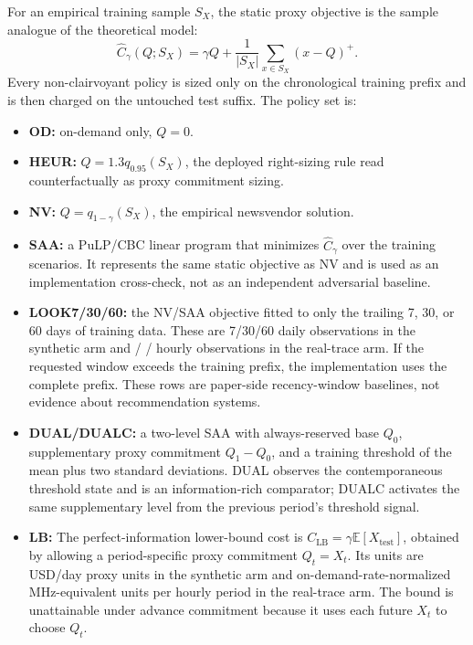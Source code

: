 \documentclass[11pt]{article}
\begin{document}
For an empirical training sample \(S_X\), the static proxy objective is the
sample analogue of the theoretical model:
\begin{equation}
\widehat C_\gamma(Q;S_X)
  = \gamma Q + \frac{1}{|S_X|}\sum_{x\in S_X}(x-Q)^+ .
\end{equation}
Every non-clairvoyant policy is sized only on the chronological training
prefix and is then charged on the untouched test suffix. The policy set is:
\begin{itemize}
\item \textbf{OD:} on-demand only, \(Q=0\).
\item \textbf{HEUR:} \(Q=1.3q_{0.95}(S_X)\), the deployed right-sizing rule
read counterfactually as proxy commitment sizing.
\item \textbf{NV:} \(Q=q_{1-\gamma}(S_X)\), the empirical newsvendor solution.
\item \textbf{SAA:} a PuLP/CBC linear program that minimizes
\(\widehat C_\gamma\) over the training scenarios. It represents the same
static objective as NV and is used as an implementation cross-check, not as
an independent adversarial baseline.
\item \textbf{LOOK7/30/60:} the NV/SAA objective fitted to only the trailing
7, 30, or 60 days of training data. These are 7/30/60 daily observations in
the synthetic arm and \extPolLookSevenPeriods{}/
\extPolLookThirtyPeriods{}/\extPolLookSixtyPeriods{} hourly observations in
the real-trace arm. If the requested window exceeds the training prefix, the
implementation uses the complete prefix. These rows are paper-side
recency-window baselines, not evidence about recommendation systems.
\item \textbf{DUAL/DUALC:} a two-level SAA with always-reserved base
\(Q_0\), supplementary proxy commitment \(Q_1-Q_0\), and a training threshold
of the mean plus two standard deviations. DUAL observes the contemporaneous
threshold state and is an information-rich comparator; DUALC activates the
same supplementary level from the previous period's threshold signal.
\item \textbf{LB:} The perfect-information lower-bound cost is
\(C_{\mathrm{LB}}=\gamma\mathbb{E}[X_{\mathrm{test}}]\), obtained by allowing a
period-specific proxy commitment \(Q_t=X_t\). Its units are USD/day proxy
units in the synthetic arm and on-demand-rate-normalized MHz-equivalent units
per hourly period in the real-trace arm. The bound is unattainable under
advance commitment because it uses each future \(X_t\) to choose \(Q_t\).
\end{itemize}
\end{document}
